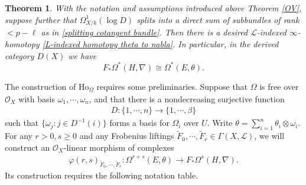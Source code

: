 \documentclass[12pt, a4paper]{article}
\newtheorem{theorem}{Theorem}[section]
\begin{document}
\begin{theorem}\label{de-Hig without truncation 2}
With the notation and assumptions introduced above Theorem \ref{OV}, suppose further that $\Omega^1_{X/k}(\log D)$ splits into a direct sum of subbundles of rank $<p-\ell$ as in \eqref{splitting cotangent bundle}. Then there is a desired $\mathcal L$-indexed $\infty$-homotopy \eqref{L-indexed homotopy theta to nabla}. In particular, in the derived category $D(X)$ we have
$$
 F_*\Omega^*(H,\nabla)\cong\Omega^*(E,\theta).
$$
 \end{theorem}



 
The construction of $\mathrm{Ho}_{\underline\Omega}$ requires some preliminaries. Suppose that $\Omega$ is free over $\mathcal O_X$ with basis $\omega_1,\cdots,\omega_n$, and that there is a nondecreasing surjective function 
\begin{eqnarray}\label{D}
D:\{1,\cdots,n\}\to\{1,\cdots,\beta\}
\end{eqnarray}
such that $\{\omega_j:j\in D^{-1}(i)\}$ forms a basis for $\Omega_i$ over $U$.  Write $\theta=\sum_{i=1}^n\theta_i\otimes\omega_i$. For any $r>0,s\geq0$ and any Frobenius liftings $\tilde F_0,\cdots,\tilde F_r\in\Gamma(X,\mathcal L)$, we will construct an $\mathcal O_X$-linear morphism of complexes
\begin{eqnarray}\label{varphi r s}
\varphi(r,s)_{\tilde F_0,\cdots,\tilde F_r}:\Omega^{r+s}(E,\theta)\to F_*\Omega^s(H,\nabla).
\end{eqnarray}
Its construction requires the following notation table.
\end{document}
